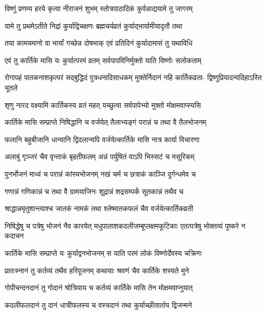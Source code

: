 \twolineshloka
{विष्णुं प्रणम्य हरये कृत्वा नीराजनं शुभम्}
{स्तोत्रपाठादिकं कुर्वन्नाद्ययामे तु जागरम्} %

\twolineshloka
{यामे तु प्रथमेऽतीते निद्रां कुर्याद्विचक्षणः}
{ब्रह्मचर्यव्रतं कुर्याद्भार्यामीयादृतौ तथा} %

\twolineshloka
{तया कामयमानो वा भार्यां गच्छेन्न दोषभाक्}
{एवं प्रतिदिनं कुर्यादामासं तु यथाविधि} %

\twolineshloka
{एवं तु कार्तिके मासि यः कुर्यात्परमं व्रतम्}
{सर्वपापविनिर्मुक्तो याति विष्णोः सलोकताम्} %

\fourlineindentedshloka
{रोगापहं पातकनाशकृत्परं}
{सद्बुद्धिदं पुत्रधनादिसाधकम्}
{मुक्तेर्निदानं नहि कार्तिकव्रता-}
{द्विष्णुप्रियादन्यदिहाऽस्ति भूतले} %





\twolineshloka
{शृणु नारद वक्ष्यामि कार्तिकस्य व्रतं महत्}
{यच्छुत्वा सर्वपापेभ्यो मुक्तो मोक्षमवाप्स्यसि} %

\twolineshloka
{कार्तिके मासि सम्प्राप्ते निषिद्धानि च वर्जयेत्}
{तैलाभ्यङ्गं परान्नं च तथा वै तैलभोजनम्} %

\twolineshloka
{फलानि बहुबीजानि धान्यानि द्विदलान्यपि}
{वर्जयेत्कार्तिके मासि नात्र कार्या विचारणा} %

\twolineshloka
{अलाबुं गृञ्जरं चैव वृन्ताकं बृहतीफलम्}
{अन्नं पर्युषितं वाऽपि भिस्सटं च मसूरिकम्} %

\twolineshloka
{पुनर्भोजनं माध्वं च परान्नं कांस्यभोजनम्}
{नखं चर्म च छत्राकं काञ्जि दुर्गन्धमेव च} %

\twolineshloka
{गणान्नं गणिकान्नं च तथा वै ग्रामयाजिनः}
{शूद्रान्नं शद्रसम्पर्कं सूतकान्नं तथैव च} %

\twolineshloka
{श्राद्धान्नमृतुशान्त्याश्च जातकं नामकं तथा}
{श्लेष्मातकफलं चैव वर्जयेत्कार्तिकव्रती} %

\threelineshloka
{निषिद्धेषु च पत्रेषु भोजनं नैव कारयेत्}
{मधुपालाशकदलीजम्बूप्लक्षमकूटिकाः}
{एतत्पत्रेषु भोक्तव्यं पुष्करे न कदाचन} %

\twolineshloka
{कार्तिके मासि सम्प्राप्ते यः कुर्याद्वनभोजनम्}
{स याति परमं लोकं विष्णोर्देवस्य चक्रिणः} %

\twolineshloka
{प्रातःस्नानं तु कर्तव्यं तथैव हरिपूजनम्}
{कथायाः श्रवणं चैव कार्तिके शस्यते मुने} %

\twolineshloka
{गोपीचन्दनदानं तु गोदानं श्रोत्रियाय च}
{कर्तव्यं कार्तिके मासि तेन मोक्षमवाप्नुयात्} %

\twolineshloka
{कदलीफलदानं तु दानं धात्रीफलस्य च}
{वस्त्रदानं तथा कुर्याच्छीतार्ताय द्विजन्मने} %

